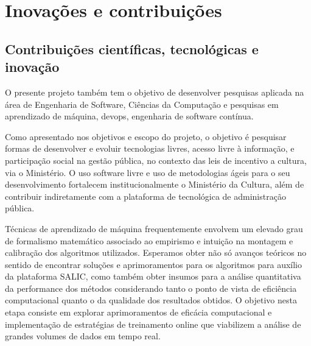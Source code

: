 \section{Inovações e contribuições}
\label{sec:resultados}

\subsection{Contribuições científicas, tecnológicas e inovação}
O presente projeto também tem o objetivo de desenvolver pesquisas aplicada na área de Engenharia de Software,
Ciências da Computação e pesquisas em aprendizado de máquina, devops, engenharia de software contínua.

Como apresentado nos objetivos e escopo do projeto, o objetivo é pesquisar
formas de desenvolver e evoluir tecnologias livres, acesso livre à informação, e participação social na
gestão pública, no contexto das leis de incentivo a cultura, via o Ministério. O uso
software livre e uso de metodologias ágeis para o seu desenvolvimento
fortalecem institucionalmente o Ministério da Cultura, além de contribuir indiretamente com a plataforma de tecnológica de administração
pública.  

Técnicas de aprendizado de máquina frequentemente envolvem um elevado grau de formalismo matemático associado ao empirismo e 
intuição na montagem e calibração dos algoritmos utilizados. Esperamos obter não só avanços teóricos no sentido de encontrar 
soluções e aprimoramentos para os algoritmos para auxílio da plataforma SALIC, como também obter insumos para a análise 
quantitativa da performance dos métodos considerando tanto o ponto de vista de eficiência computacional quanto o da qualidade dos 
resultados obtidos. O objetivo nesta etapa consiste em explorar aprimoramentos de eficácia computacional e implementação de estratégias de treinamento online que viabilizem a análise de grandes volumes de dados em tempo real.


